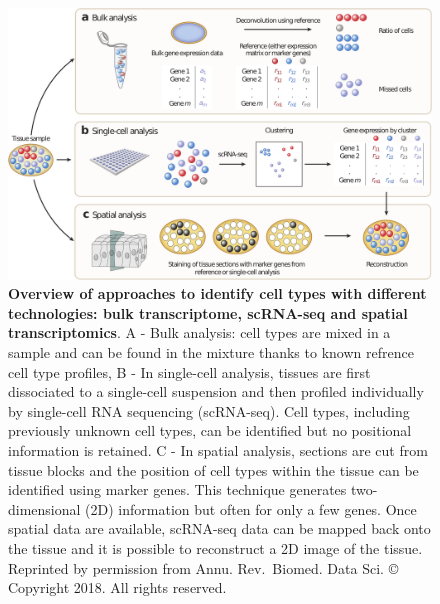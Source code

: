 \documentclass[12pt,]{book}
\theoremstyle{definition}
\theoremstyle{definition}
\theoremstyle{definition}
\theoremstyle{remark}
\begin{document}
\begin{figure}

{\centering \includegraphics[width=1\linewidth]{figures-ext/sing_cell_reiview} 

}

\caption[Overview of approaches to identify cell types with different technologies]{\textbf{Overview of approaches to identify cell
types with different technologies: bulk transcriptome, scRNA-seq and
spatial transcriptomics}. A - Bulk analysis: cell types are mixed in a
sample and can be found in the mixture thanks to known refrence cell
type profiles, B - In single-cell analysis, tissues are first
dissociated to a single-cell suspension and then profiled individually
by single-cell RNA sequencing (scRNA-seq). Cell types, including
previously unknown cell types, can be identified but no positional
information is retained. C - In spatial analysis, sections are cut from
tissue blocks and the position of cell types within the tissue can be
identified using marker genes. This technique generates two-dimensional
(2D) information but often for only a few genes. Once spatial data are
available, scRNA-seq data can be mapped back onto the tissue and it is
possible to reconstruct a 2D image of the tissue. Reprinted by
permission from Annu. Rev.~Biomed. Data Sci. \citep{Chen2018b} ©
Copyright 2018. All rights reserved.}\label{fig:screvi}
\end{figure}
\end{document}
